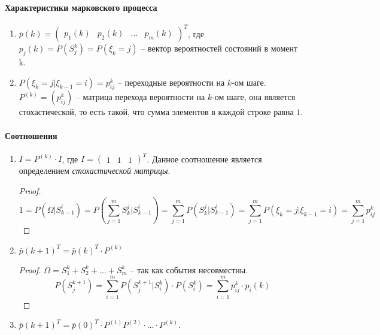 \paragraph{Характеристики марковского процесса}

\begin{enumerate}
  \item $\bar{p}(k) = \begin{pmatrix} p_1 (k) & p_2(k) & \dots & p_m(k) \end{pmatrix}^T $,
    где $p_j(k) = P(S_j^k) = P(\xi_k = j)$ -- вектор вероятностей состояний в
    момент k.

  \item $P(\xi_k = j | \xi_{k-1} = i) = p_{ij}^{k}$ -- переходные вероятности на $k$-ом шаге.
    $P^{(k)} = (p_{ij}^k)$ -- матрица перехода вероятности на $k$-ом шаге, она является
    стохастической, то есть такой, что сумма элементов в каждой строке равна $1$.
\end{enumerate}

\paragraph{Соотношения}
\begin{enumerate}
  \item $I = P^{(k)} \cdot I$, где $I = \begin{pmatrix} 1 & 1 & 1 \end{pmatrix}^T $. 
    Данное соотношение является определением \emph{стохастической матрицы}.
    \begin{proof}
      \[
        1 = P(\Omega | S_{k-1}^i) = P(\sum_{j=1}^m S_k^j | S_{k-1}^i)
        = \sum_{j=1}^m P(S_k^j | S_{k-1}^i)
        = \sum_{j=1}^m P(\xi_k = j | \xi_{k-1}=i) = \sum_{j=1}^m p_{ij}^k
      \]
    \end{proof}

  \item $\bar{p} (k+1) ^T = \bar{p}(k)^T \cdot P^{(k)}$
    \begin{proof}
      $\Omega = S_1^k + S_2^k + \dots + S_m^k$ -- так как события несовместны.
    \[
      P(S_j^{k+1}) = \sum_{i=1}^m P(S_j^{k+1} | S_i^k) \cdot P(S_i^k)
      = \sum_{i=1}^m p_{ij}^k \cdot p_i(k)
    \]
    \end{proof}

  \item $\bar{p} (k+1)^T = \bar{p}(0)^T \cdot P^{(1)} P^{(2)} \cdot \dots \cdot P^{(k)}$.
\end{enumerate}

